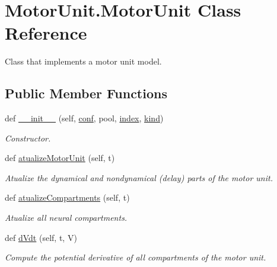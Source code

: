 \hypertarget{class_motor_unit_1_1_motor_unit}{}\section{Motor\+Unit.\+Motor\+Unit Class Reference}
\label{class_motor_unit_1_1_motor_unit}


Class that implements a motor unit model.  


\subsection*{Public Member Functions}
\begin{DoxyCompactItemize}
\item 
def \hyperlink{class_motor_unit_1_1_motor_unit_ac5228576ec1287f06debf92067c7402b}{\+\_\+\+\_\+init\+\_\+\+\_\+} (self, \hyperlink{class_motor_unit_1_1_motor_unit_a10539f5129881188923f3a3a164d2cba}{conf}, pool, \hyperlink{class_motor_unit_1_1_motor_unit_a4f3205a9273aabb92d425992d91a1848}{index}, \hyperlink{class_motor_unit_1_1_motor_unit_a08ed5171ba46e0b1ea5bc7d08296c612}{kind})
\begin{DoxyCompactList}\small\item\em Constructor. \end{DoxyCompactList}\item 
def \hyperlink{class_motor_unit_1_1_motor_unit_ab57693c2f49518b08639456595e92d87}{atualize\+Motor\+Unit} (self, t)
\begin{DoxyCompactList}\small\item\em Atualize the dynamical and nondynamical (delay) parts of the motor unit. \end{DoxyCompactList}\item 
def \hyperlink{class_motor_unit_1_1_motor_unit_a666fa3bb4b8fb00f1217387a5ede5b7b}{atualize\+Compartments} (self, t)
\begin{DoxyCompactList}\small\item\em Atualize all neural compartments. \end{DoxyCompactList}\item 
def \hyperlink{class_motor_unit_1_1_motor_unit_adf30fdef09ac21cfc2a261b762a7f618}{d\+Vdt} (self, t, V)
\begin{DoxyCompactList}\small\item\em Compute the potential derivative of all compartments of the motor unit. \end{DoxyCompactList}\item 

\end{DoxyCompactItemize}
